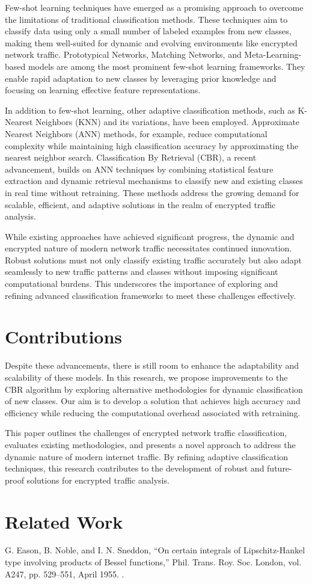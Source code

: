 \documentclass[conference]{IEEEtran}
\begin{document}
Few-shot learning techniques have emerged as a promising approach to overcome the limitations of traditional classification methods. These techniques aim to classify data using only a small number of labeled examples from new classes, making them well-suited for dynamic and evolving environments like encrypted network traffic. Prototypical Networks, Matching Networks, and Meta-Learning-based models are among the most prominent few-shot learning frameworks. They enable rapid adaptation to new classes by leveraging prior knowledge and focusing on learning effective feature representations.

In addition to few-shot learning, other adaptive classification methods, such as K-Nearest Neighbors (KNN) and its variations, have been employed. Approximate Nearest Neighbors (ANN) methods, for example, reduce computational complexity while maintaining high classification accuracy by approximating the nearest neighbor search. Classification By Retrieval (CBR), a recent advancement, builds on ANN techniques by combining statistical feature extraction and dynamic retrieval mechanisms to classify new and existing classes in real time without retraining. These methods address the growing demand for scalable, efficient, and adaptive solutions in the realm of encrypted traffic analysis.

While existing approaches have achieved significant progress, the dynamic and encrypted nature of modern network traffic necessitates continued innovation. Robust solutions must not only classify existing traffic accurately but also adapt seamlessly to new traffic patterns and classes without imposing significant computational burdens. This underscores the importance of exploring and refining advanced classification frameworks to meet these challenges effectively.


\section{Contributions} 
Despite these advancements, there is still room to enhance the adaptability and scalability of these models. In this research, we propose improvements to the CBR algorithm by exploring alternative methodologies for dynamic classification of new classes. Our aim is to develop a solution that achieves high accuracy and efficiency while reducing the computational overhead associated with retraining.

This paper outlines the challenges of encrypted network traffic classification, evaluates existing methodologies, and presents a novel approach to address the dynamic nature of modern internet traffic. By refining adaptive classification techniques, this research contributes to the development of robust and future-proof solutions for encrypted traffic analysis.


\section{Related Work}






\begin{thebibliography}{00}
 G. Eason, B. Noble, and I. N. Sneddon, ``On certain integrals of Lipschitz-Hankel type involving products of Bessel functions,'' Phil. Trans. Roy. Soc. London, vol. A247, pp. 529--551, April 1955.
.
\end{thebibliography}
\
\end{document}
